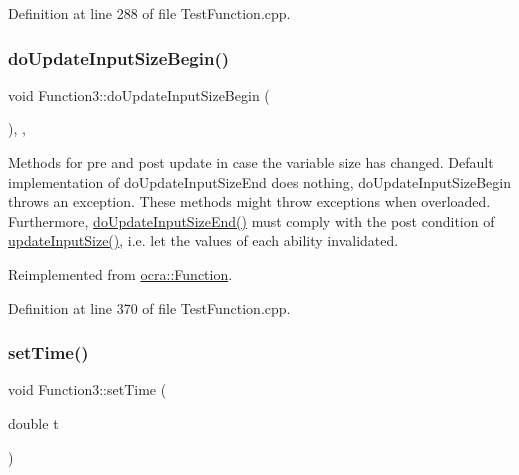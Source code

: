 Definition at line 288 of file Test\+Function.\+cpp.

\hypertarget{classFunction3_a00a1ea6f2a0fdc5df66004e23038fff0}{}\label{classFunction3_a00a1ea6f2a0fdc5df66004e23038fff0} 
\subsubsection{\texorpdfstring{do\+Update\+Input\+Size\+Begin()}{doUpdateInputSizeBegin()}}
{\footnotesize\ttfamily void Function3\+::do\+Update\+Input\+Size\+Begin (\begin{DoxyParamCaption}{ }\end{DoxyParamCaption})\hspace{0.3cm}{\ttfamily [inline]}, {\ttfamily [protected]}, {\ttfamily [virtual]}}

Methods for pre and post update in case the variable size has changed. Default implementation of do\+Update\+Input\+Size\+End does nothing, do\+Update\+Input\+Size\+Begin throws an exception. These methods might throw exceptions when overloaded. Furthermore, {\ttfamily \hyperlink{classocra_1_1Function_a39f6d91b72eff2d32da7e4a85ee79f7d}{do\+Update\+Input\+Size\+End()}} must comply with the post condition of {\ttfamily \hyperlink{classocra_1_1Function_a3a5b9e6ae296339acc87ab2cbf97ef98}{update\+Input\+Size()}}, i.\+e. let the values of each ability invalidated. 

Reimplemented from \hyperlink{classocra_1_1Function_a3f728f3758e6448aa59932853db5ddcc}{ocra\+::\+Function}.



Definition at line 370 of file Test\+Function.\+cpp.

\hypertarget{classFunction3_ade56597de44f5cdd047aa9aa9e29a129}{}\label{classFunction3_ade56597de44f5cdd047aa9aa9e29a129} 
\subsubsection{\texorpdfstring{set\+Time()}{setTime()}}
{\footnotesize\ttfamily void Function3\+::set\+Time (\begin{DoxyParamCaption}\item[{double}]{t }\end{DoxyParamCaption})\hspace{0.3cm}{\ttfamily [inline]}}



